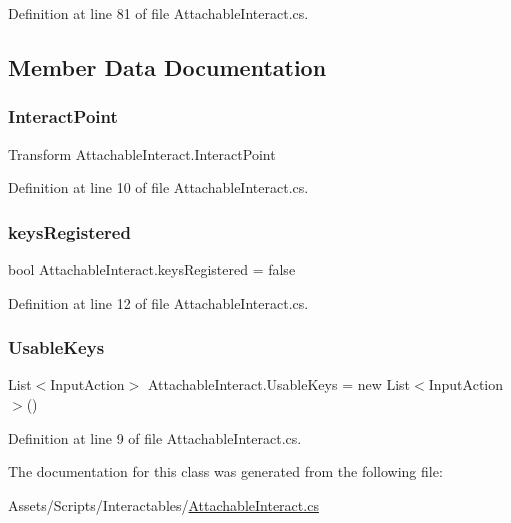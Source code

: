 Definition at line 81 of file Attachable\+Interact.\+cs.



\subsection{Member Data Documentation}
\mbox{\label{class_attachable_interact_ad46e0ca3808d58ab5e1102e379d6cb7e}} 
\subsubsection{\texorpdfstring{Interact\+Point}{InteractPoint}}
{\footnotesize\ttfamily Transform Attachable\+Interact.\+Interact\+Point}



Definition at line 10 of file Attachable\+Interact.\+cs.

\mbox{\label{class_attachable_interact_a27e2c7faf9280bbc0e52c6360c79daf6}} 
\subsubsection{\texorpdfstring{keys\+Registered}{keysRegistered}}
{\footnotesize\ttfamily bool Attachable\+Interact.\+keys\+Registered = false\hspace{0.3cm}{\ttfamily [protected]}}



Definition at line 12 of file Attachable\+Interact.\+cs.

\mbox{\label{class_attachable_interact_a3c3ffc1d5b3cfd3bc9b4fde20a772901}} 
\subsubsection{\texorpdfstring{Usable\+Keys}{UsableKeys}}
{\footnotesize\ttfamily List$<$Input\+Action$>$ Attachable\+Interact.\+Usable\+Keys = new List$<$Input\+Action$>$()}



Definition at line 9 of file Attachable\+Interact.\+cs.



The documentation for this class was generated from the following file\+:\begin{DoxyCompactItemize}
\item 
Assets/\+Scripts/\+Interactables/\mbox{\hyperlink{_attachable_interact_8cs}{Attachable\+Interact.\+cs}}\end{DoxyCompactItemize}
